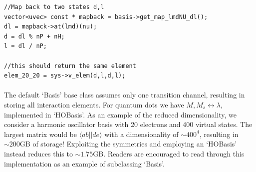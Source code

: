 \begin{lstlisting}[float,label={lst:qDots:mapBackward},caption={Continuing listing~\ref{lst:qDots:mapForward}, accessing the same element again, $\langle \nu || \nu \rangle_{\lambda} = \langle 20||20 \rangle$, now using the reverse mapping, $|\nu\rangle_{\lambda} \rightarrow |20\rangle$.},name={lst:qDots:map}]
//Map back to two states d,l
vector<uvec> const * mapback = basis->get_map_lmdNU_dl();
dl = mapback->at(lmd)(nu);
d = dl % nP + nH;
l = dl / nP;

//this should return the same element
elem_20_20 = sys->v_elem(d,l,d,l);
\end{lstlisting}

\paragraph*{}
The default `Basis' base class assumes only one transition channel, resulting in storing all interaction elements.
For quantum dots we have $M,M_s \leftrightarrow \lambda$, implemented in `HOBasis'.
As an example of the reduced dimensionality, we consider a harmonic oscillator basis with 20 electrons and 400 virtual states.
The largest matrix would be $\langle ab||de \rangle$ with a dimensionality of $\sim 400^4$, resulting in $\sim 200$GB of storage!
Exploiting the symmetries and employing an `HOBasis' instead reduces this to $\sim 1.75$GB.
Readers are encouraged to read through this implementation as an example of subclassing `Basis'.




